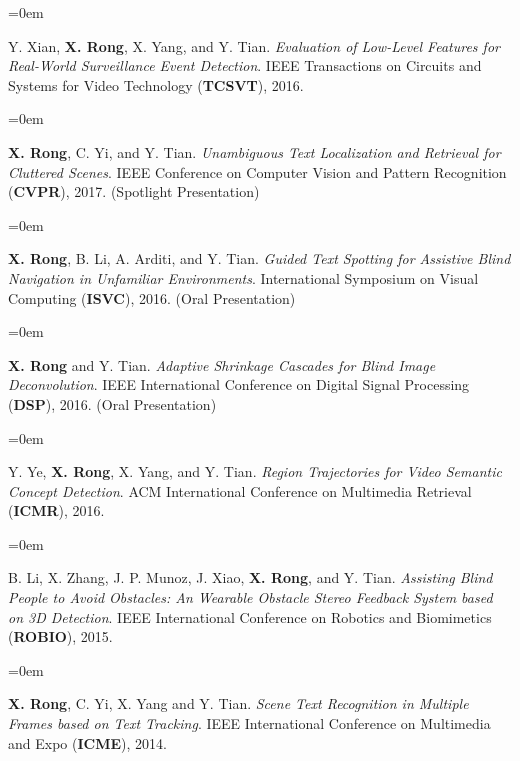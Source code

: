 \documentclass{scrartcl}
\newcommand{\Description}[1]{\hangindent=0em\hangafter=0\noindent\raggedright\footnotesize{#1}\par\normalsize\vspace{1em}} %
\begin{document}
\begin{cv}{}
\noindent{}\vspace{0.5em}

\Description{Y. Xian, \textbf{X. Rong}, X. Yang, and Y. Tian. \textit{Evaluation of Low-Level Features for Real-World Surveillance Event Detection}. IEEE Transactions on Circuits and Systems for Video Technology (\textbf{TCSVT}), 2016.}

\vspace{0.5em} %

\noindent{}\vspace{0.5em}

\Description{\textbf{X. Rong}, C. Yi, and Y. Tian. \textit{Unambiguous Text Localization and Retrieval for Cluttered Scenes}. IEEE Conference on Computer Vision and Pattern Recognition (\textbf{CVPR}), 2017. (Spotlight Presentation)}

\Description{\textbf{X. Rong}, B. Li, A. Arditi, and Y. Tian. \textit{Guided Text Spotting for Assistive Blind Navigation in Unfamiliar Environments}. International Symposium on Visual Computing (\textbf{ISVC}), 2016. (Oral Presentation)}

\Description{\textbf{X. Rong} and Y. Tian. \textit{Adaptive Shrinkage Cascades for Blind Image Deconvolution}. IEEE International Conference on Digital Signal Processing (\textbf{DSP}), 2016. (Oral Presentation)}

\Description{Y. Ye, \textbf{X. Rong}, X. Yang, and Y. Tian. \textit{Region Trajectories for Video Semantic Concept Detection}. ACM International Conference on Multimedia Retrieval (\textbf{ICMR}), 2016.}

\Description{B. Li, X. Zhang, J. P. Munoz, J. Xiao, \textbf{X. Rong}, and Y. Tian. \textit{Assisting Blind People to Avoid Obstacles: An Wearable Obstacle Stereo Feedback System based on 3D Detection}. IEEE International Conference on Robotics and Biomimetics (\textbf{ROBIO}), 2015.}

\Description{\textbf{X. Rong}, C. Yi, X. Yang and Y. Tian. \textit{Scene Text Recognition in Multiple Frames based on Text Tracking}. IEEE International Conference on Multimedia and Expo (\textbf{ICME}), 2014.}


\end{cv}
\end{document}
